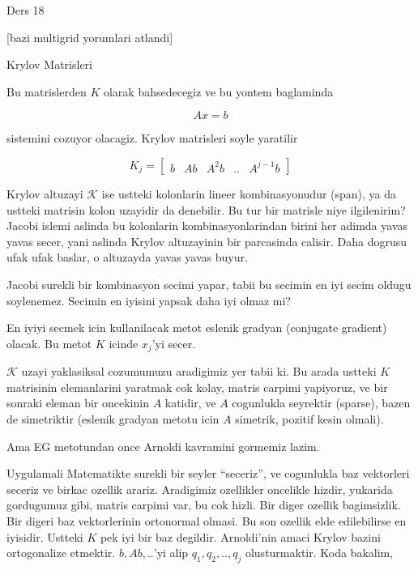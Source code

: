 \documentclass[12pt,fleqn]{article}\usepackage{../common}
\begin{document}
Ders 18

[bazi multigrid yorumlari atlandi]

Krylov Matrisleri 

Bu matrislerden $K$ olarak bahsedecegiz ve bu yontem baglaminda 

\[ Ax = b \]

sistemini cozuyor olacagiz. Krylov matrisleri soyle yaratilir

\[ K_j = \left[\begin{array}{rrrrr}
b & Ab & A^2b & .. & A^{j-1}b
\end{array}\right] \]

Krylov altuzayi $\mathscr{K}$ ise ustteki kolonlarin lineer kombinasyonudur
(span), ya da ustteki matrisin kolon uzayidir da denebilir. Bu tur bir
matrisle niye ilgilenirim? Jacobi islemi aslinda bu kolonlarin
kombinasyonlarindan birini her adimda yavas yavas secer, yani aslinda
Krylov altuzayinin bir parcasinda calisir. Daha dogrusu ufak ufak baslar, o
altuzayda yavas yavas buyur.

Jacobi surekli bir kombinasyon secimi yapar, tabii bu secimin en iyi secim
oldugu soylenemez. Secimin en iyisini yapsak daha iyi olmaz mi? 

En iyiyi secmek icin kullanilacak metot eslenik gradyan (conjugate
gradient) olacak. Bu metot $K$ icinde $x_j$'yi secer. 

$\mathscr{K}$ uzayi yaklasiksal cozumumuzu aradigimiz yer tabii ki. Bu arada ustteki
$K$ matrisinin elemanlarini yaratmak cok kolay, matris carpimi yapiyoruz, ve
bir sonraki eleman bir oncekinin $A$ katidir, ve $A$ cogunlukla seyrektir
(sparse), bazen de simetriktir (eslenik gradyan metotu icin $A$ simetrik,
pozitif kesin olmali).

Ama EG metotundan once Arnoldi kavramini gormemiz lazim. 

Uygulamali Matematikte surekli bir seyler ``seceriz'', ve cogunlukla baz
vektorleri seceriz ve birkac ozellik arariz. Aradigimiz ozellikler
oncelikle hizdir, yukarida gordugumuz gibi, matris carpimi var, bu cok
hizli. Bir diger ozellik bagimsizlik. Bir digeri baz vektorlerinin
ortonormal olmasi. Bu son ozellik elde edilebilirse en iyisidir. Ustteki
$K$ pek iyi bir baz degildir. Arnoldi'nin amaci Krylov bazini ortogonalize
etmektir. $b,Ab,..$'yi alip $q_1,q_2,..,q_j$ olusturmaktir. Koda bakalim, 
\end{document}
